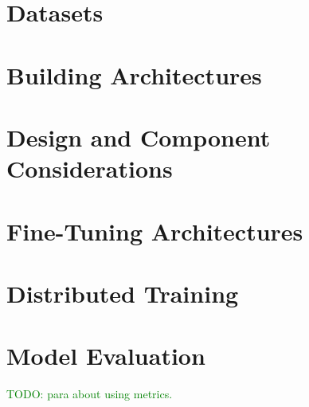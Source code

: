 \section{Datasets}






\section{Building Architectures}








\section{Design and Component Considerations}














\section{Fine-Tuning Architectures}





\section{Distributed Training}



\section{Model Evaluation}

\textcolor{green}{TODO: para about using metrics.}

